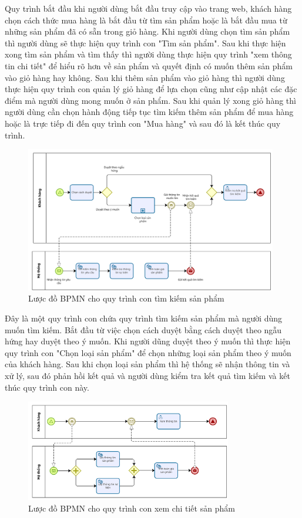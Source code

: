 Quy trình bắt đầu khi người dùng bắt đầu truy cập vào trang web, khách hàng chọn cách thức mua hàng là bắt đầu từ tìm sản phẩm hoặc là bắt đầu mua từ những sản phẩm đã có sẵn trong giỏ hàng. Khi người dùng chọn tìm sản phẩm thì người dùng sẽ thực hiện quy trình con "Tìm sản phẩm". Sau khi thực hiện xong tìm sản phẩm và tìm thấy thì người dùng thực hiện quy trình "xem thông tin chi tiết" để hiểu rõ hơn về sản phẩm và quyết định có muốn thêm sản phẩm vào giỏ hàng hay không. Sau khi thêm sản phẩm vào giỏ hàng thì người dùng thực hiện quy trình con quản lý giỏ hàng để lựa chọn cũng như cập nhật các đặc điểm mà người dùng mong muốn ở sản phẩm. Sau khi quản lý xong giỏ hàng thì người dùng cần chọn hành động tiếp tục tìm kiếm thêm sản phẩm để mua hàng hoặc là trực tiếp đi đến quy trình con "Mua hàng" và sau đó là kết thúc quy trình.


\begin{figure}[!htp]
	\centering
	\includegraphics[width=11cm]{img/BPMN/customer_buy/customer_search_product.png}
	\newline
	\caption{Lược đồ BPMN cho quy trình con tìm kiếm sản phẩm}
\end{figure}

Đây là một quy trình con chứa quy trình tìm kiếm sản phẩm mà người dùng muốn tìm kiếm. Bắt đầu từ việc chọn cách duyệt bằng cách duyệt theo ngẫu hứng hay duyệt theo ý muốn. Khi người dũng duyệt theo ý muốn thì thực hiện quy trình con "Chọn loại sản phẩm" để chọn những loại sản phẩm theo ý muốn của khách hàng. Sau khi chọn loại sản phẩm thì hệ thống sẽ nhận thông tin và xử lý, sau đó phản hồi kết quả và người dùng kiểm tra kết quả tìm kiếm và kết thúc quy trình con này.

\begin{figure}[!htp]
	\centering
	\includegraphics[width=9cm]{img/BPMN/customer_buy/customer_buy_product_detail.png}
	\newline
	\caption{Lược đồ BPMN cho quy trình con xem chi tiết sản phẩm}
\end{figure}

